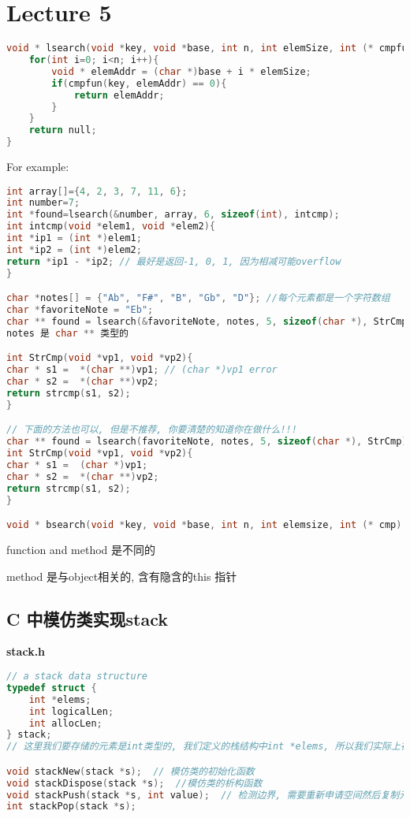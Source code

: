 \documentclass{article}
\begin{document}
\section{Lecture 5}
\begin{lstlisting}[language = C]
void * lsearch(void *key, void *base, int n, int elemSize, int (* cmpfun)(void *, void *)){
	for(int i=0; i<n; i++){
		void * elemAddr = (char *)base + i * elemSize;
		if(cmpfun(key, elemAddr) == 0){
			return elemAddr;
		}
	}
	return null;
}
\end{lstlisting}
For example:
\begin{lstlisting}[language = C]
int array[]={4, 2, 3, 7, 11, 6};
int number=7;
int *found=lsearch(&number, array, 6, sizeof(int), intcmp);
int intcmp(void *elem1, void *elem2){
int *ip1 = (int *)elem1;
int *ip2 = (int *)elem2;
return *ip1 - *ip2; // 最好是返回-1, 0, 1, 因为相减可能overflow
}

char *notes[] = {"Ab", "F#", "B", "Gb", "D"}; //每个元素都是一个字符数组
char *favoriteNote = "Eb";
char ** found = lsearch(&favoriteNote, notes, 5, sizeof(char *), StrCmp);
notes 是 char ** 类型的

int StrCmp(void *vp1, void *vp2){
char * s1 =  *(char **)vp1; // (char *)vp1 error
char * s2 =  *(char **)vp2;
return strcmp(s1, s2);
}

// 下面的方法也可以, 但是不推荐, 你要清楚的知道你在做什么!!!
char ** found = lsearch(favoriteNote, notes, 5, sizeof(char *), StrCmp);
int StrCmp(void *vp1, void *vp2){
char * s1 =  (char *)vp1;
char * s2 =  *(char **)vp2;
return strcmp(s1, s2);
}

void * bsearch(void *key, void *base, int n, int elemsize, int (* cmp)(void *, void *))
\end{lstlisting}

function and method 是不同的

method 是与object相关的, 含有隐含的this 指针

\subsection{C 中模仿类实现stack}
\textbf{stack.h}
\begin{lstlisting}[language = C]
// a stack data structure
typedef struct {
	int *elems;
	int logicalLen;
	int allocLen;
} stack;
// 这里我们要存储的元素是int类型的, 我们定义的栈结构中int *elems, 所以我们实际上在栈中存储的是我们想要存储东西的指针, 在这里, 也就是说栈中的元素是int *类型的

void stackNew(stack *s);  // 模仿类的初始化函数
void stackDispose(stack *s);  //模仿类的析构函数
void stackPush(stack *s, int value);  // 检测边界, 需要重新申请空间然后复制元素后再添加
int stackPop(stack *s);
\end{lstlisting}
\end{document}
